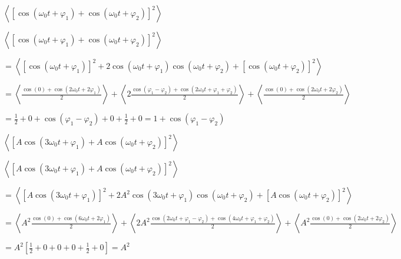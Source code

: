 
\begin{enonce}
$\left<\left[\cos\left(\omega_0 t + \varphi_1\right) + \cos\left(\omega_0 t + \varphi_2\right)\right]^2\right>$
\end{enonce}
	
	
\begin{corrige}
	$\left<\left[\cos\left(\omega_0 t + \varphi_1\right) + \cos\left(\omega_0 t + \varphi_2\right)\right]^2\right>$
	
	$=\left<\left[\cos(\omega_0 t + \varphi_1)\right]^2 + 2\cos(\omega_0 t + \varphi_1) \cos(\omega_0 t + \varphi_2) + \left[\cos(\omega_0 t + \varphi_2)\right]^2 \right>$

	$=\left<\frac{\cos(0)+\cos(2\omega_0 t + 2\varphi_1)}{2}\right> + \left<2 \frac{\cos(\varphi_1-\varphi_2)+\cos(2\omega_0 t + \varphi_1+ \varphi_2)}{2}\right> + \left<\frac{\cos(0)+\cos(2\omega_0 t + 2\varphi_2)}{2}\right>$

	$=\frac{1}{2}+0+\cos(\varphi_1-\varphi_2)+0+\frac{1}{2}+0=1+\cos\left(\varphi_1-\varphi_2\right)$
\end{corrige}



\begin{enonce}
$\left<\left[A\cos(3\omega_0 t + \varphi_1) + A\cos(\omega_0 t + \varphi_2)\right]^2\right>$
\end{enonce}
		
		
\begin{corrige}
	$\left<\left[A\cos(3\omega_0 t + \varphi_1) + A\cos(\omega_0 t + \varphi_2)\right]^2\right>$
	
	$=\left<\left[A\cos(3\omega_0 t + \varphi_1)\right]^2 + 2 A^2 \cos(3\omega_0 t + \varphi_1) \cos(\omega_0 t + \varphi_2) + \left[A\cos(\omega_0 t + \varphi_2)\right]^2 \right>$

	$=\left<A^2 \frac{\cos(0)+\cos(6\omega_0 t + 2\varphi_1)}{2}\right> + \left<2 A^2 \frac{\cos(2\omega_0 t+\varphi_1-\varphi_2)+\cos(4\omega_0 t + \varphi_1+ \varphi_2)}{2}\right> + \left<A^2 \frac{\cos(0)+\cos(2\omega_0 t + 2\varphi_2)}{2}\right>$

	$=A^2 \left[\frac{1}{2}+0+0+0+\frac{1}{2}+0 \right]=A^2$
\end{corrige}
	
